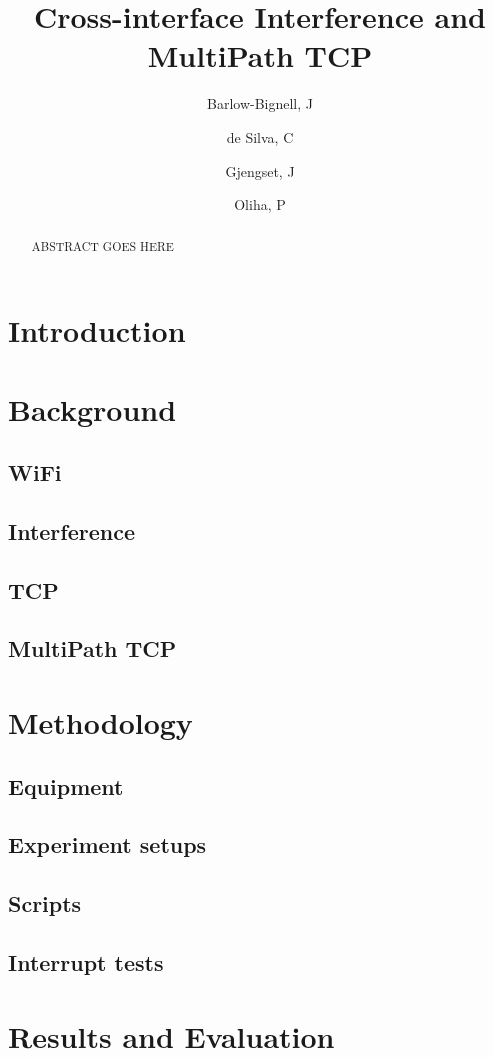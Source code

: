 \documentclass[12pt,a4paper]{article}
\title{Cross-interface Interference and MultiPath TCP}
\author{Barlow-Bignell, J}
\author{de Silva, C}
\author{Gjengset, J}
\author{Oliha, P}
\affil{University College London}
\date{}
\begin{document}
\maketitle

\begin{abstract}
  ABSTRACT GOES HERE
\end{abstract}
\clearpage

\section{Introduction}

\section{Background}
\subsection{WiFi}
\subsection{Interference}
\subsection{TCP}
\subsection{MultiPath TCP}

\section{Methodology}
\subsection{Equipment}
\subsection{Experiment setups}
\subsection{Scripts}
\subsection{Interrupt tests}

\section{Results and Evaluation}
\end{document}
